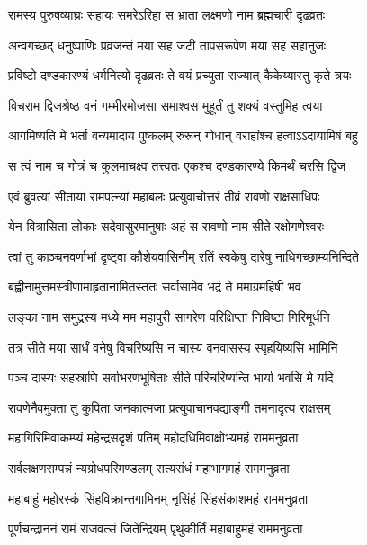 \twolineshloka
{रामस्य पुरुषव्याघ्रः सहायः समरेऽरिहा}
{स भ्राता लक्ष्मणो नाम ब्रह्मचारी दृढव्रतः} %

\twolineshloka
{अन्वगच्छद् धनुष्पाणिः प्रव्रजन्तं मया सह}
{जटी तापसरूपेण मया सह सहानुजः} %

\twolineshloka
{प्रविष्टो दण्डकारण्यं धर्मनित्यो दृढव्रतः}
{ते वयं प्रच्युता राज्यात् कैकेय्यास्तु कृते त्रयः} %

\twolineshloka
{विचराम द्विजश्रेष्ठ वनं गम्भीरमोजसा}
{समाश्वस मुहूर्तं तु शक्यं वस्तुमिह त्वया} %

\twolineshloka
{आगमिष्यति मे भर्ता वन्यमादाय पुष्कलम्}
{रुरून् गोधान् वराहांश्च हत्वाऽऽदायामिषं बहु} %

\twolineshloka
{स त्वं नाम च गोत्रं च कुलमाचक्ष्व तत्त्वतः}
{एकश्च दण्डकारण्ये किमर्थं चरसि द्विज} %

\twolineshloka
{एवं ब्रुवत्यां सीतायां रामपत्न्यां महाबलः}
{प्रत्युवाचोत्तरं तीव्रं रावणो राक्षसाधिपः} %

\twolineshloka
{येन वित्रासिता लोकाः सदेवासुरमानुषाः}
{अहं स रावणो नाम सीते रक्षोगणेश्वरः} %

\twolineshloka
{त्वां तु काञ्चनवर्णाभां दृष्ट्वा कौशेयवासिनीम्}
{रतिं स्वकेषु दारेषु नाधिगच्छाम्यनिन्दिते} %

\twolineshloka
{बह्वीनामुत्तमस्त्रीणामाहृतानामितस्ततः}
{सर्वासामेव भद्रं ते ममाग्रमहिषी भव} %

\twolineshloka
{लङ्का नाम समुद्रस्य मध्ये मम महापुरी}
{सागरेण परिक्षिप्ता निविष्टा गिरिमूर्धनि} %

\twolineshloka
{तत्र सीते मया सार्धं वनेषु विचरिष्यसि}
{न चास्य वनवासस्य स्पृहयिष्यसि भामिनि} %

\twolineshloka
{पञ्च दास्यः सहस्राणि सर्वाभरणभूषिताः}
{सीते परिचरिष्यन्ति भार्या भवसि मे यदि} %

\twolineshloka
{रावणेनैवमुक्ता तु कुपिता जनकात्मजा}
{प्रत्युवाचानवद्याङ्गी तमनादृत्य राक्षसम्} %

\twolineshloka
{महागिरिमिवाकम्प्यं महेन्द्रसदृशं पतिम्}
{महोदधिमिवाक्षोभ्यमहं राममनुव्रता} %

\twolineshloka
{सर्वलक्षणसम्पन्नं न्यग्रोधपरिमण्डलम्}
{सत्यसंधं महाभागमहं राममनुव्रता} %

\twolineshloka
{महाबाहुं महोरस्कं सिंहविक्रान्तगामिनम्}
{नृसिंहं सिंहसंकाशमहं राममनुव्रता} %

\twolineshloka
{पूर्णचन्द्राननं रामं राजवत्सं जितेन्द्रियम्}
{पृथुकीर्तिं महाबाहुमहं राममनुव्रता} %

